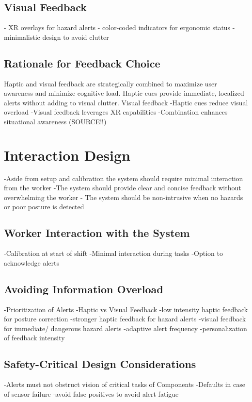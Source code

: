 \subsection{Visual Feedback}
- XR overlays for hazard alerts
- color-coded indicators for ergonomic status
- minimalistic design to avoid clutter

\subsection{Rationale for Feedback Choice}
Haptic and visual feedback are strategically combined to maximize user awareness and minimize cognitive load. Haptic cues provide immediate, localized alerts without adding to visual clutter. Visual feedback 
-Haptic cues reduce visual overload
-Visual feedback leverages XR capabilities
-Combination enhances situational awareness (SOURCE!!)

\section{Interaction Design}
-Aside from setup and calibration the system should require minimal interaction from the worker
-The system should provide clear and concise feedback without overwhelming the worker
- The system should be non-intrusive when no hazards or poor posture is detected
\subsection{Worker Interaction with the System}
-Calibration at start of shift
-Minimal interaction during tasks
-Option to acknowledge alerts

\subsection{Avoiding Information Overload}
-Prioritization of Alerts
-Haptic vs Visual Feedback
-low intensity haptic feedback for posture correction
-stronger haptic feedback for hazard alerts
-visual feedback for immediate/ dangerous hazard alerts
-adaptive alert frequency 
-personalization of feedback intensity

\subsection{Safety-Critical Design Considerations}
-Alerts must not obstruct vision of critical tasks of Components
-Defaults in case of sensor failure
-avoid false positives to avoid alert fatigue



